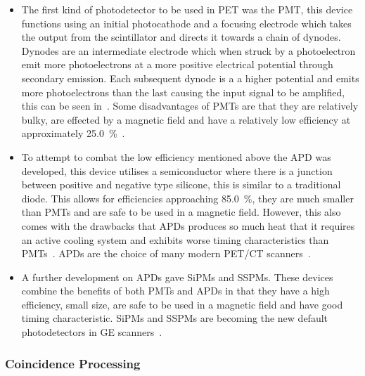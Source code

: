                 \begin{itemize}
                    \item The first kind of photodetector to be used in \gls{PET} was the \gls{PMT}, this device functions using an initial photocathode and a focusing electrode which takes the output from the scintillator and directs it towards a chain of dynodes. Dynodes are an intermediate electrode which when struck by a photoelectron emit more photoelectrons at a more positive electrical potential through secondary emission. Each subsequent dynode is a a higher potential and emits more photoelectrons than the last causing the input signal to be amplified, this can be seen in~. Some disadvantages of \glspl{PMT} are that they are relatively bulky, are effected by a magnetic field and have a relatively low efficiency at approximately \SI{25.0}{\percent}~\parencite{petspringer, SiPmBib}.
                    
                    \item To attempt to combat the low efficiency mentioned above the \gls{APD} was developed, this device utilises a semiconductor where there is a junction between positive and negative type silicone, this is similar to a traditional diode. This allows for efficiencies approaching \SI{85.0}{\percent}, they are much smaller than \glspl{PMT} and are safe to be used in a magnetic field. However, this also comes with the drawbacks that \glspl{APD} produces so much heat that it requires an active cooling system and exhibits worse timing characteristics than \glspl{PMT}~\parencite{AvalanchePhotodiodeBib}. \glspl{APD} are the choice of many modern \gls{PET}/\gls{CT} scanners~\parencite{Vandendriessche2019}.
                    
                    \item A further development on \glspl{APD} gave \glspl{SiPM} and \glspl{SSPM}. These devices combine the benefits of both \glspl{PMT} and \glspl{APD} in that they have a high efficiency, small size, are safe to be used in a magnetic field and have good timing characteristic. \glspl{SiPM} and \glspl{SSPM} are becoming the new default photodetectors in \gls{GE} scanners~\parencite{SiPmBib}.
                \end{itemize}
            
            \subsubsection{Coincidence Processing} \label{sec:coincidence_processing}
                
